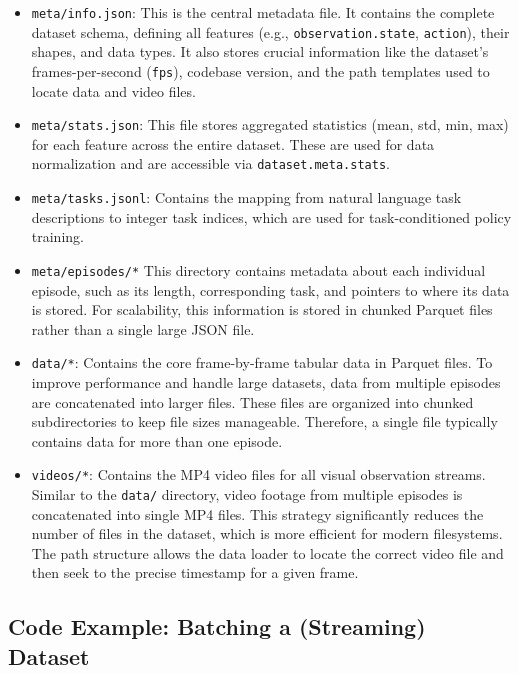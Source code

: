 \begin{itemize}
\item \texttt{meta/info.json}: This is the central metadata file. It contains the complete dataset schema, defining all features (e.g., \texttt{observation.state}, \texttt{action}), their shapes, and data types. It also stores crucial information like the dataset's frames-per-second (\texttt{fps}), codebase version, and the path templates used to locate data and video files.
\item \texttt{meta/stats.json}: This file stores aggregated statistics (mean, std, min, max) for each feature across the entire dataset. These are used for data normalization and are accessible via \texttt{dataset.meta.stats}.
\item \texttt{meta/tasks.jsonl}: Contains the mapping from natural language task descriptions to integer task indices, which are used for task-conditioned policy training.
\item \texttt{meta/episodes/*} This directory contains metadata about each individual episode, such as its length, corresponding task, and pointers to where its data is stored. For scalability, this information is stored in chunked Parquet files rather than a single large JSON file.
\item \texttt{data/*}: Contains the core frame-by-frame tabular data in Parquet files. To improve performance and handle large datasets, data from multiple episodes are concatenated into larger files. These files are organized into chunked subdirectories to keep file sizes manageable. Therefore, a single file typically contains data for more than one episode.
\item \texttt{videos/*}: Contains the MP4 video files for all visual observation streams. Similar to the \texttt{data/} directory, video footage from multiple episodes is concatenated into single MP4 files. This strategy significantly reduces the number of files in the dataset, which is more efficient for modern filesystems. The path structure allows the data loader to locate the correct video file and then seek to the precise timestamp for a given frame.
\end{itemize}

\subsection{Code Example: Batching a (Streaming) Dataset}

